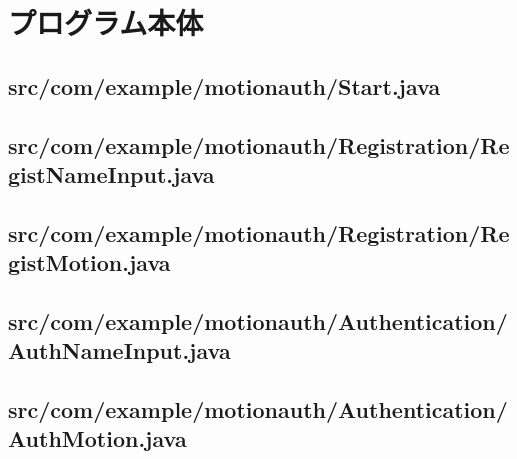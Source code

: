 \documentclass[11pt]{jreport}
\renewcommand{\slash}{/}
\begin{document}
\chapter{プログラム本体}
    \section{src\slash com\slash example\slash motionauth\slash Start.java}
    

    \section{src\slash com\slash example\slash motionauth\slash Registration\slash RegistNameInput.java}
    

    \section{src\slash com\slash example\slash motionauth\slash Registration\slash RegistMotion.java}
    

    \section{src\slash com\slash example\slash motionauth\slash Authentication\slash AuthNameInput.java}
    

    \section{src\slash com\slash example\slash motionauth\slash Authentication\slash AuthMotion.java}
    
\end{document}
